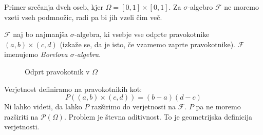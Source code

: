 \documentclass[12pt]{book}
\def\n{\noindent}
\theoremstyle{definition}
\theoremstyle{plain}
\theoremstyle{plain}
\theoremstyle{plain}
\theoremstyle{remark}
\begin{document}
\begin{zgled}
    Primer srečanja dveh oseb, kjer $\Omega=[0,1] \times[0,1]$. Za $\sigma$-algebro $\mathcal{F}$ ne moremo vzeti vseh podmnožic, radi pa bi jih vzeli čim več.

    \n $\mathcal{F}$ naj bo najmanjša $\sigma$-algebra, ki vsebje vse odprte pravokotnike $(a, b)\times(c, d)$ (izkaže se, da je isto, če vzamemo zaprte pravokotnike). $\mathcal{F}$ imenujemo \emph{Borelova $\sigma$-algebra}.

    \begin{figure}[H]
        \centering

        \caption{Odprt pravokotnik v $\Omega$}
        \label{fig:2}
    \end{figure}

    \n Verjetnost definiramo na pravokotnikih kot: 
    $$
    P((a, b) \times(c, d))=(b-a)(d-c)
    $$
    Ni lahko videti, da lahko $P$ razširimo do verjetnosti na $\mathcal{F}$. $P$ pa ne moremo razširiti na $\mathcal{P}(\Omega)$. Problem je števna aditivnost. To je geometrijska definicija verjetnosti.
\end{zgled}
\end{document}
